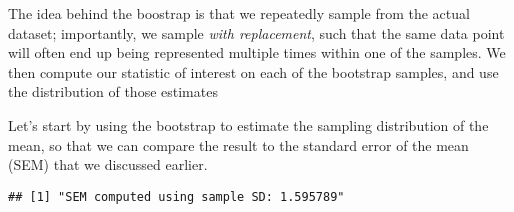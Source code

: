 \documentclass[]{book}
\newenvironment{Shaded}{\begin{snugshade}}{\end{snugshade}}
\newcommand{\KeywordTok}[1]{\textcolor[rgb]{0.13,0.29,0.53}{\textbf{#1}}}
\newcommand{\DataTypeTok}[1]{\textcolor[rgb]{0.13,0.29,0.53}{#1}}
\newcommand{\DecValTok}[1]{\textcolor[rgb]{0.00,0.00,0.81}{#1}}
\newcommand{\StringTok}[1]{\textcolor[rgb]{0.31,0.60,0.02}{#1}}
\newcommand{\CommentTok}[1]{\textcolor[rgb]{0.56,0.35,0.01}{\textit{#1}}}
\newcommand{\OtherTok}[1]{\textcolor[rgb]{0.56,0.35,0.01}{#1}}
\newcommand{\ControlFlowTok}[1]{\textcolor[rgb]{0.13,0.29,0.53}{\textbf{#1}}}
\newcommand{\OperatorTok}[1]{\textcolor[rgb]{0.81,0.36,0.00}{\textbf{#1}}}
\newcommand{\NormalTok}[1]{#1}
\theoremstyle{definition}
\theoremstyle{definition}
\theoremstyle{definition}
\theoremstyle{remark}
\begin{document}
The idea behind the boostrap is that we repeatedly sample from the
actual dataset; importantly, we sample \emph{with replacement}, such
that the same data point will often end up being represented multiple
times within one of the samples. We then compute our statistic of
interest on each of the bootstrap samples, and use the distribution of
those estimates

Let's start by using the bootstrap to estimate the sampling distribution
of the mean, so that we can compare the result to the standard error of
the mean (SEM) that we discussed earlier.

\begin{Shaded}
\end{Shaded}

\begin{verbatim}
## [1] "SEM computed using sample SD: 1.595789"
\end{verbatim}

\begin{Shaded}
\end{Shaded}
\end{document}
